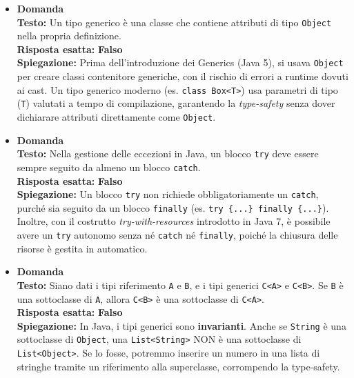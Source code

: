 \documentclass[12pt, a4paper]{article}
\begin{document}
\begin{itemize}
    \item {}\textbf{Domanda \thedomanda} \\
    \textbf{Testo:} Un tipo generico è una classe che contiene attributi di tipo \texttt{Object} nella propria definizione. \\
    \textbf{Risposta esatta:} \textbf{Falso} \\
    \textbf{Spiegazione:} Prima dell'introduzione dei Generics (Java 5), si usava \texttt{Object} per creare classi contenitore generiche, con il rischio di errori a runtime dovuti ai cast. Un tipo generico moderno (es. \texttt{class Box<T>}) usa parametri di tipo (\texttt{T}) valutati a tempo di compilazione, garantendo la \textit{type-safety} senza dover dichiarare attributi direttamente come \texttt{Object}.
    \vspace{0.3cm}

    \item {}\textbf{Domanda \thedomanda} \\
    \textbf{Testo:} Nella gestione delle eccezioni in Java, un blocco \texttt{try} deve essere sempre seguito da almeno un blocco \texttt{catch}. \\
    \textbf{Risposta esatta:} \textbf{Falso} \\
    \textbf{Spiegazione:} Un blocco \texttt{try} non richiede obbligatoriamente un \texttt{catch}, purché sia seguito da un blocco \texttt{finally} (es. \texttt{try \{...\} finally \{...\}}). Inoltre, con il costrutto \textit{try-with-resources} introdotto in Java 7, è possibile avere un \texttt{try} autonomo senza né \texttt{catch} né \texttt{finally}, poiché la chiusura delle risorse è gestita in automatico.
    \vspace{0.3cm}

    \item {}\textbf{Domanda \thedomanda} \\
    \textbf{Testo:} Siano dati i tipi riferimento \texttt{A} e \texttt{B}, e i tipi generici \texttt{C<A>} e \texttt{C<B>}. Se \texttt{B} è una sottoclasse di \texttt{A}, allora \texttt{C<B>} è una sottoclasse di \texttt{C<A>}. \\
    \textbf{Risposta esatta:} \textbf{Falso} \\
    \textbf{Spiegazione:} In Java, i tipi generici sono \textbf{invarianti}. Anche se \texttt{String} è una sottoclasse di \texttt{Object}, una \texttt{List<String>} NON è una sottoclasse di \texttt{List<Object>}. Se lo fosse, potremmo inserire un numero in una lista di stringhe tramite un riferimento alla superclasse, corrompendo la type-safety.
    \vspace{0.3cm}


\end{itemize}
\end{document}
